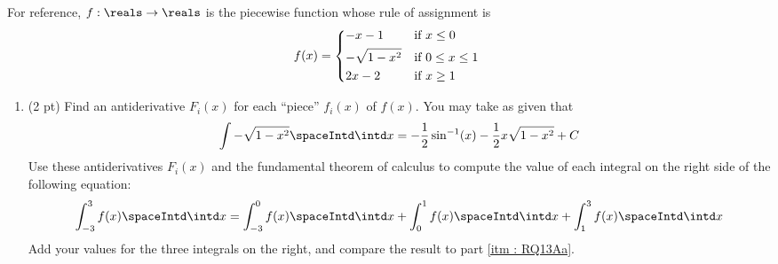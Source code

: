 \spaceSolution{1in}{%
}%



\noindent{}For reference, $f : \reals \rightarrow \reals$ is the piecewise function whose rule of assignment is
\begin{align*}
f(x)
=
\begin{dcases*}
-x - 1			&	if $x \leq 0$		\\
-\sqrt{1 - x^{2}}	&	if $0 \leq x \leq 1$	\\
2 x - 2		&	if $x \geq 1$
\end{dcases*}
\end{align*}

\begin{enumerate}[resume,label=(\alph*)]
\item\label{itm : RQ13Ac} (2 pt) Find an antiderivative $F_{i}(x)$ for each ``piece'' $f_{i}(x)$ of $f(x)$. You may take as given that
\begin{align*}
\int -\sqrt{1 - x^{2}} \spaceIntd \intd x
=
-\frac{1}{2} \sin^{-1}(x) - \frac{1}{2} x \sqrt{1 - x^{2}} + C
\end{align*}
Use these antiderivatives $F_{i}(x)$ and the fundamental theorem of calculus to compute the value of each integral on the right side of the following equation:
\begin{align*}
\int_{-3}^{3} f(x) \spaceIntd \intd x
=
\int_{-3}^{0} f(x) \spaceIntd \intd x
+
\int_{0}^{1} f(x) \spaceIntd \intd x
+
\int_{1}^{3} f(x) \spaceIntd \intd x%
\end{align*}
Add your values for the three integrals on the right, and compare the result to part \ref{itm : RQ13Aa}.
\end{enumerate}

\spaceSolution{3in}{%
}%